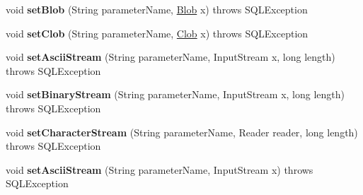 \begin{DoxyCompactItemize}
\item 
\mbox{\label{classcom_1_1mysql_1_1cj_1_1jdbc_1_1_callable_statement_wrapper_a1851ea6263ffd0bdfb7d9ff99bc0b005}} 
void {\bfseries set\+Blob} (String parameter\+Name, \mbox{\hyperlink{classcom_1_1mysql_1_1cj_1_1jdbc_1_1_blob}{Blob}} x)  throws S\+Q\+L\+Exception 
\item 
\mbox{\label{classcom_1_1mysql_1_1cj_1_1jdbc_1_1_callable_statement_wrapper_af470b6517c5682d0dcb97ba5a8ae6793}} 
void {\bfseries set\+Clob} (String parameter\+Name, \mbox{\hyperlink{classcom_1_1mysql_1_1cj_1_1jdbc_1_1_clob}{Clob}} x)  throws S\+Q\+L\+Exception 
\item 
\mbox{\label{classcom_1_1mysql_1_1cj_1_1jdbc_1_1_callable_statement_wrapper_a8696452651a545d08fa35fcd409653b4}} 
void {\bfseries set\+Ascii\+Stream} (String parameter\+Name, Input\+Stream x, long length)  throws S\+Q\+L\+Exception 
\item 
\mbox{\label{classcom_1_1mysql_1_1cj_1_1jdbc_1_1_callable_statement_wrapper_af8ccc9962716995b1fce2b70f2dfa584}} 
void {\bfseries set\+Binary\+Stream} (String parameter\+Name, Input\+Stream x, long length)  throws S\+Q\+L\+Exception 
\item 
\mbox{\label{classcom_1_1mysql_1_1cj_1_1jdbc_1_1_callable_statement_wrapper_af9333c7ad778e02028067ccd121fdd66}} 
void {\bfseries set\+Character\+Stream} (String parameter\+Name, Reader reader, long length)  throws S\+Q\+L\+Exception 
\item 
\mbox{\label{classcom_1_1mysql_1_1cj_1_1jdbc_1_1_callable_statement_wrapper_a5889ef071cb5ed26ee3136e5b18a4fe7}} 
void {\bfseries set\+Ascii\+Stream} (String parameter\+Name, Input\+Stream x)  throws S\+Q\+L\+Exception 
\item 
\mbox{\label{classcom_1_1mysql_1_1cj_1_1jdbc_1_1_callable_statement_wrapper_a706189ca9c4467d5b91906a376fe3774}} 

\end{DoxyCompactItemize}
